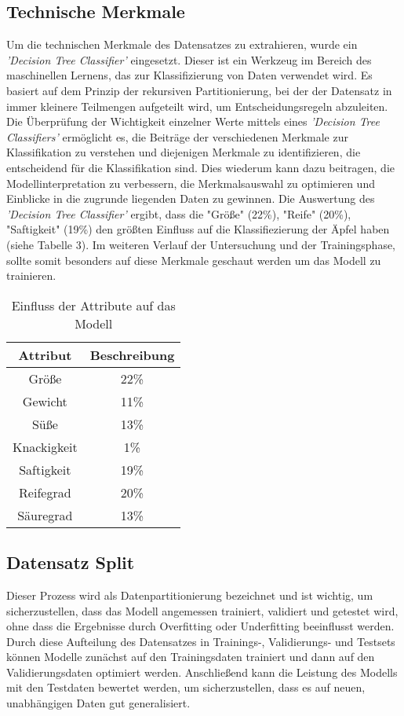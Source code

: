 \documentclass{article}
\begin{document}
\subsection{Technische Merkmale}
Um die technischen Merkmale des Datensatzes zu extrahieren, wurde ein {\itshape 'Decision Tree Classifier'} eingesetzt. Dieser ist ein Werkzeug im Bereich des maschinellen Lernens, das zur Klassifizierung von Daten verwendet wird. Es basiert auf dem Prinzip der rekursiven Partitionierung, bei der der Datensatz in immer kleinere Teilmengen aufgeteilt wird, um Entscheidungsregeln abzuleiten.\\ 
Die Überprüfung der Wichtigkeit einzelner Werte mittels eines {\itshape 'Decision Tree Classifiers'} ermöglicht es, die Beiträge der verschiedenen Merkmale zur Klassifikation zu verstehen und diejenigen Merkmale zu identifizieren, die entscheidend für die Klassifikation sind. Dies wiederum kann dazu beitragen, die Modellinterpretation zu verbessern, die Merkmalsauswahl zu optimieren und Einblicke in die zugrunde liegenden Daten zu gewinnen. Die Auswertung des {\itshape 'Decision Tree Classifier'} ergibt, dass die "Größe" (22\%), "Reife" (20\%), "Saftigkeit" (19\%) den größten Einfluss auf die Klassifiezierung der Äpfel haben (siehe Tabelle 3). Im weiteren Verlauf der Untersuchung und der Trainingsphase, sollte somit besonders auf diese Merkmale geschaut werden um das Modell zu trainieren. 
\begin{table}[h]
\centering
\begin{tabular}{|c|c|}
\hline
\textbf{Attribut} & \textbf{Beschreibung} \\
\hline
Größe & 22\% \\
Gewicht & 11\% \\
Süße & 13\% \\
Knackigkeit & 1\% \\
Saftigkeit & 19\% \\
Reifegrad & 20\% \\
Säuregrad & 13\% \\
\hline
\end{tabular}
\caption{Einfluss der Attribute auf das Modell}
\end{table}

\subsection{Datensatz Split}
Dieser Prozess wird als Datenpartitionierung bezeichnet und ist wichtig, um sicherzustellen, dass das Modell angemessen trainiert, validiert und getestet wird, ohne dass die Ergebnisse durch Overfitting oder Underfitting beeinflusst werden. Durch diese Aufteilung des Datensatzes in Trainings-, Validierungs- und Testsets können Modelle zunächst auf den Trainingsdaten trainiert und dann auf den Validierungsdaten optimiert werden. Anschließend kann die Leistung des Modells mit den Testdaten bewertet werden, um sicherzustellen,  dass es auf neuen, unabhängigen Daten gut generalisiert.
\end{document}

